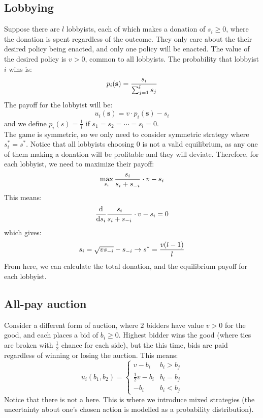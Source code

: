 \subsection{Lobbying}
Suppose there are $l$ lobbyists, each of which makes a donation of $s_i \ge 0$, where the donation is spent regardless of the outcome. They only care about the their desired policy being enacted, and only one policy will be enacted. The value of the desired policy is $v > 0$, common to all lobbyists. The probability that lobbyist $i$ wins is:
$$p_i(\mathbf{s}) = \frac{s_i}{\sum_{j = 1}^{l} s_j}$$
The payoff for the lobbyist will be:
$$u_i(\mathbf{s}) = v \cdot p_i(\mathbf{s}) - s_i$$
and we define $p_i(s) = \frac{1}{l}$ if $s_1 = s_2 = \cdots = s_l = 0$. \\
The game is symmetric, so we only need to consider symmetric strategy where $s_i^* = s^*$. Notice that all lobbyists choosing $0$ is not a valid equilibrium, as any one of them making a donation will be profitable and they will deviate. Therefore, for each lobbyist, we need to maximize their payoff:
$$\max_{s_i} \frac{s_i}{s_i  + s_{-i}} \cdot v - s_i$$
This means:
$$\dv{s_i} \frac{s_i}{s_i  + s_{-i}} \cdot v - s_i = 0$$
which gives:
$$s_i = \sqrt{vs_{-i}} - s_{-i} \to s^* = \frac{v(l - 1)}{l}$$
From here, we can calculate the total donation, and the equilibrium payoff for each lobbyist.

\subsection{All-pay auction}
Consider a different form of auction, where $2$ bidders have value $v > 0$ for the good, and each places a bid of $b_i \ge 0$. Highest bidder wins the good (where ties are broken with $\frac{1}{2}$ chance for each side), but the this time, bids are paid regardless of winning or losing the auction. This means:
$$u_i(b_1, b_2) = \begin{cases}
    v - b_i & b_i > b_j \\
    \frac{1}{2}v - b_i & b_i = b_j \\
    -b_i & b_i < b_j
\end{cases}$$
Notice that there is not a  here. This is where we introduce mixed strategies (the uncertainty about one's chosen action is modelled as a probability distribution).

